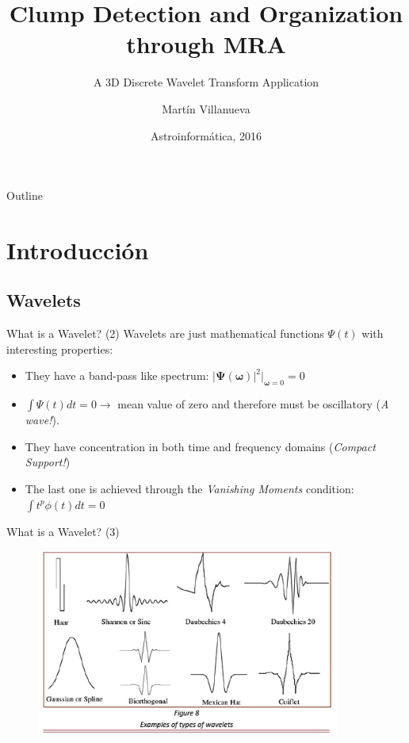 \documentclass{beamer}
\title{Clump Detection and Organization through MRA}
\subtitle{A 3D Discrete Wavelet Transform Application}
\author{Martín Villanueva\inst{1}}
\institute[Universidad Técnica Federico Santa María] %
{
  \inst{1}%
  Departamento de Informática\\
  Universidad Técnica Federico Santa María}
\date{Astroinformática, 2016}
\begin{document}
\begin{frame}
  \titlepage
\end{frame}



\begin{frame}{Outline}
  \tableofcontents
\end{frame}




\section{Introducción}

\subsection{Wavelets}

\begin{frame}{What is a Wavelet? (2)}
Wavelets are just mathematical functions $\Psi(t)$ with interesting properties:

\begin{itemize}
    \item  They have a band-pass like spectrum: $|\boldsymbol{\Psi}(\boldsymbol{\omega})|^2 \bigg|_{\boldsymbol{\omega}=0} = 0$
    \item $\int \Psi(t) dt = 0 \rightarrow$ mean value of zero and therefore must be oscillatory (\textit{A wave!}).
    \item They have concentration in both time and frequency domains (\textit{Compact Support!})
    \item The last one is achieved through the \textit{Vanishing Moments} condition: $\int t^p \phi(t) dt = 0$
\end{itemize}
\end{frame}

\begin{frame}{What is a Wavelet? (3)}
\begin{figure}[htpb!]
\centering
\includegraphics[width=10cm]{wav_ex}
\end{figure}    
\end{frame}
\end{document}
